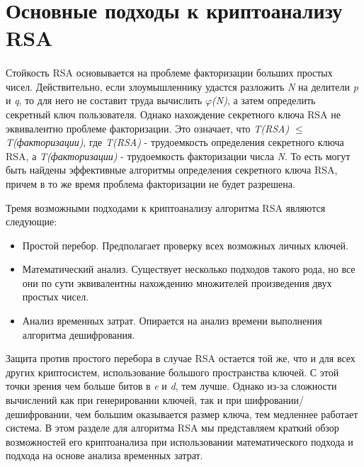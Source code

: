 
\section{Основные подходы к криптоанализу RSA}

  \paragraph{} Стойкость RSA основывается на проблеме факторизации больших простых чисел. Действительно, если злоумышленнику удастся разложить
  \textit{N} на делители \textit{p} и \textit{q}, то для него не составит труда вычислить \textit{{$\varphi$}(N)}, а затем определить секретный ключ пользователя. 
  Однако нахождение секретного ключа RSA не эквивалентно проблеме факторизации. Это означает, что \textit{T(RSA) {$\le$} T(факторизации)}, 
  где \textit{T(RSA)} - трудоемкость определения секретного ключа RSA, а \textit{T(факторизации)} - трудоемкость факторизации числа \textit{N}. То есть могут быть найдены эффективные алгоритмы определения секретного ключа RSA, причем в то же время проблема факторизации не будет разрешена.
  
  Тремя возможными подходами к криптоанализу алгоритма RSA являются следующие:
  
    \begin{itemize}
     \item Простой перебор. Предполагает проверку всех возможных личных ключей.
     \item Математический анализ. Существует несколько подходов такого рода, но все они по сути эквивалентны нахождению множителей произведения 
     двух простых чисел.
     \item Анализ временных затрат. Опирается на анализ времени выполнения алгоритма дешифрования.
    \end{itemize}
    
  Защита против простого перебора в случае RSA остается той же, что и для всех других криптосистем, использование большого пространства 
  ключей. С этой точки зрения чем больше битов в \textit{e} и \textit{d}, тем лучше. Однако из-за сложности вычислений как при генерировании 
  ключей, так и при шифровании/дешифровании, чем большим оказывается размер ключа, тем медленнее работает система. В этом разделе для 
  алгоритма RSA мы представляем краткий обзор возможностей его криптоанализа при использовании математического подхода и подхода на основе 
  анализа временных затрат.
  
